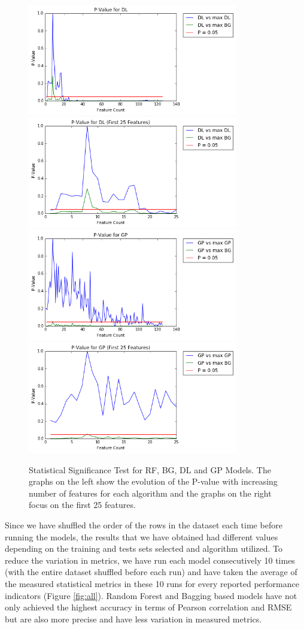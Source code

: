 \documentclass[journal]{IEEEtran}
\begin{document}
\begin{figure}[ht!]
\includegraphics[width=3.6in]{./pdl.png}
\includegraphics[width=3.6in]{./pdlzoom.png}
\includegraphics[width=3.6in]{./pgp.png}
\includegraphics[width=3.6in]{./pgpzoom.png}

\caption{Statistical Significance Test for RF, BG, DL and GP Models. The graphs on the left show the evolution of the P-value with increasing number of features for each algorithm and the graphs on the right focus on the first 25 features.}
\label{fig:stats}
\end{figure}

Since we have shuffled the order of the rows in the dataset each time before running the models, the results that we have obtained had different values depending on the training and tests sets selected and algorithm utilized. To reduce the variation in metrics, we have run each model consecutively 10 times (with the entire dataset shuffled before each run) and have taken the average of the measured statistical metrics in these 10 runs for every reported performance indicators (Figure \ref{fig:all}). Random Forest and Bagging based models have not only achieved the highest accuracy in terms of Pearson correlation and RMSE but are also more precise and have less variation in measured metrics.
\end{document}
